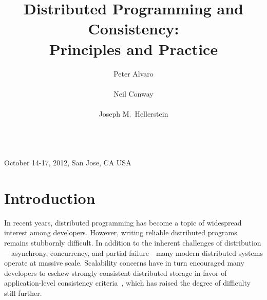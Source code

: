 \usepackage{color}
\usepackage{graphicx}
\usepackage{url}
\usepackage{xspace}
\usepackage[T1]{fontenc}
\usepackage{times}
\usepackage{txfonts}  %
\usepackage{textcomp}
\usepackage[protrusion=true,expansion=true]{microtype}
\usepackage{paralist}
\usepackage{comment}
\usepackage[hidelinks]{hyperref}

\def\blooml{Bloom$^L$\xspace}

\frenchspacing



 {October 14-17, 2012, San Jose, CA USA} 

\title{Distributed Programming and Consistency:\\Principles and Practice}

\author{
\alignauthor
Peter Alvaro\\
        \\
\alignauthor
Neil Conway\\
        \\
\alignauthor
Joseph M.\ Hellerstein\\
        \\
}

\maketitle




\section{Introduction}

In recent years, distributed programming has become a topic of widespread
interest among developers. However, writing reliable distributed programs
remains stubbornly difficult. In addition to the inherent challenges of
distribution---asynchrony, concurrency, and partial failure---many modern
distributed systems operate at massive scale. Scalability concerns have in turn
encouraged many developers to eschew strongly consistent distributed storage in
favor of application-level consistency criteria~\cite{Birman2009,Helland2009,vogels},
which has raised the degree of difficulty still further.

